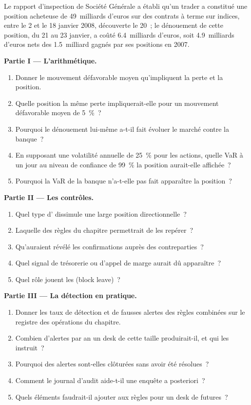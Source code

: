 \begin{problem}\label{pb:rc:operational-risk-and-rogue-trading:1}
Le rapport d'inspection de Société Générale a établi qu'un trader a constitué une position acheteuse de 49~milliards d'euros
sur des contrats à terme sur indices, entre le 2 et le 18 janvier 2008, découverte le 20~; le dénouement de cette position, du 21 au 23 janvier,
a coûté 6.4~milliards d'euros, soit 4.9~milliards d'euros nets des 1.5~milliard gagnés par ses positions en 2007.

\medskip\noindent\textbf{Partie I --- L'arithmétique.}
\begin{enumerate}
\item Donner le mouvement défavorable moyen qu'impliquent la perte et la position.
\item Quelle position la même perte impliquerait-elle pour un mouvement défavorable moyen de 5~\%~?
\item Pourquoi le dénouement lui-même a-t-il fait évoluer le marché contre la banque~?
\item En supposant une volatilité annuelle de 25~\% pour les actions, quelle VaR à un jour au niveau de confiance de 99~\%
la position aurait-elle affichée~?
\item Pourquoi la VaR de la banque n'a-t-elle pas fait apparaître la position~?
\end{enumerate}

\medskip\noindent\textbf{Partie II --- Les contrôles.}
\begin{enumerate}[resume]
\item Quel type d' dissimule une large position directionnelle~?
\item Laquelle des règles du chapitre permettrait de les repérer~?
\item Qu'auraient révélé les confirmations auprès des contreparties~?
\item Quel signal de trésorerie ou d'appel de marge aurait dû apparaître~?
\item Quel rôle jouent les  (block leave)~?
\end{enumerate}

\medskip\noindent\textbf{Partie III --- La détection en pratique.}
\begin{enumerate}[resume]
\item Donner les taux de détection et de fausses alertes des règles combinées sur le registre des opérations du chapitre.
\item Combien d'alertes par an un desk de cette taille produirait-il, et qui les instruit~?
\item Pourquoi des alertes sont-elles clôturées sans avoir été résolues~?
\item Comment le journal d'audit aide-t-il une enquête a posteriori~?
\item Quels éléments faudrait-il ajouter aux règles pour un desk de futures~?
\end{enumerate}


\end{problem}
